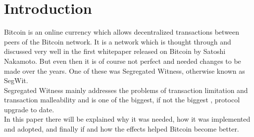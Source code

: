 
\section{Introduction}
\label{ch:Introduction}


Bitcoin is an online currency which allows decentralized transactions between peers of the Bitcoin network. It is a network which is thought through and discussed very well in the first whitepaper released on Bitcoin by Satoshi Nakamoto. \cite{nakamoto} But even then it is of course not perfect and needed changes to be made over the years. One of these was Segregated Witness, otherwise known as SegWit. \\
Segregated Witness mainly addresses the problems of transaction limitation and transaction malleability and is one of the biggest, if not the biggest \cite{bitoinmagazine}, protocol upgrade to date. \\
In this paper there will be explained why it was needed, how it was implemented and adopted, and finally if and how the effects helped Bitcoin become better.